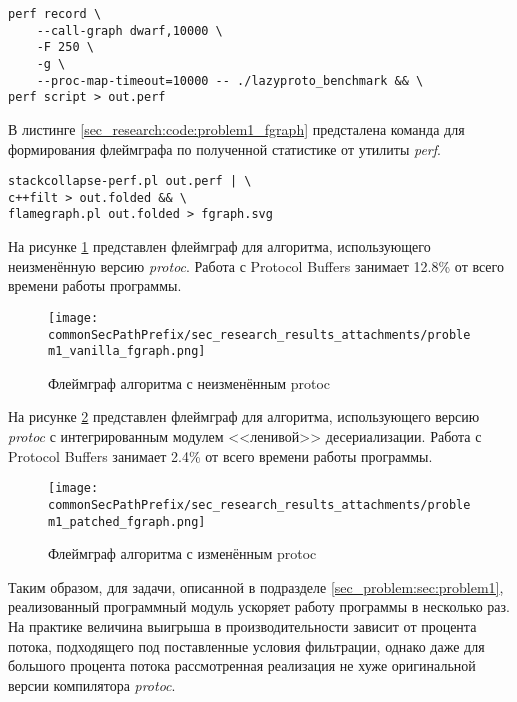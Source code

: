 \noindent\begin{minipage}{\linewidth}
\begin{lstlisting}[style=CodeListing, caption={bash-инструкция для сбора статистики утилитой perf}, label=sec_research:code:problem1_perf]
perf record \
    --call-graph dwarf,10000 \
    -F 250 \
    -g \
    --proc-map-timeout=10000 -- ./lazyproto_benchmark && \
perf script > out.perf
\end{lstlisting}
\end{minipage}

В листинге \ref{sec_research:code:problem1_fgraph} предсталена команда для формирования флеймграфа по полученной статистике от утилиты \textit{perf}.

\noindent\begin{minipage}{\linewidth}
\begin{lstlisting}[style=CodeListing, caption={bash-инструкция для сбора статистики утилитой perf}, label=sec_research:code:problem1_fgraph]
stackcollapse-perf.pl out.perf | \
c++filt > out.folded && \
flamegraph.pl out.folded > fgraph.svg
\end{lstlisting}
\end{minipage}

На рисунке \ref{fig:problem1_vanilla_fgraph} представлен флеймграф для алгоритма, использующего неизменённую версию \textit{protoc}. 
Работа с Protocol Buffers занимает 12.8\% от всего времени работы программы.

\begin{figure}[H]
    \centering
    \texttt{[image: \\commonSecPathPrefix/sec\_research\_results\_attachments/problem1\_vanilla\_fgraph.png]}
    \caption{Флеймграф алгоритма с неизменённым protoc}
    \label{fig:problem1_vanilla_fgraph}
\end{figure}

На рисунке \ref{fig:problem1_patched_fgraph} представлен флеймграф для алгоритма, использующего версию \textit{protoc} с интегрированным модулем <<ленивой>> десериализации. 
Работа с Protocol Buffers занимает 2.4\% от всего времени работы программы.

\begin{figure}[H]
    \centering
    \texttt{[image: \\commonSecPathPrefix/sec\_research\_results\_attachments/problem1\_patched\_fgraph.png]}
    \caption{Флеймграф алгоритма с изменённым protoc}
    \label{fig:problem1_patched_fgraph}
\end{figure}

Таким образом, для задачи, описанной в подразделе \ref{sec_problem:sec:problem1}, реализованный программный модуль ускоряет работу программы в несколько раз.
На практике величина выигрыша в производительности зависит от процента потока, подходящего под поставленные условия фильтрации, однако даже для большого процента потока
рассмотренная реализация не хуже оригинальной версии компилятора \textit{protoc}.

